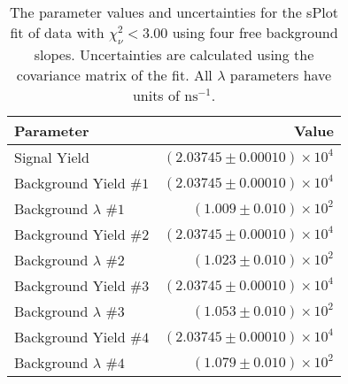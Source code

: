 
\begin{table}[ht]
    \begin{center}
        \begin{tabular}{lr}\toprule
            Parameter & Value \\\midrule
            Signal Yield & $(2.03745 \pm 0.00010) \times 10^{4}$ \\
            Background Yield $\#1$ & $(2.03745 \pm 0.00010) \times 10^{4}$ \\
            Background $\lambda$ $\#1$ & $(1.009 \pm 0.010) \times 10^{2}$ \\
            Background Yield $\#2$ & $(2.03745 \pm 0.00010) \times 10^{4}$ \\
            Background $\lambda$ $\#2$ & $(1.023 \pm 0.010) \times 10^{2}$ \\
            Background Yield $\#3$ & $(2.03745 \pm 0.00010) \times 10^{4}$ \\
            Background $\lambda$ $\#3$ & $(1.053 \pm 0.010) \times 10^{2}$ \\
            Background Yield $\#4$ & $(2.03745 \pm 0.00010) \times 10^{4}$ \\
            Background $\lambda$ $\#4$ & $(1.079 \pm 0.010) \times 10^{2}$ \\\bottomrule
        \end{tabular}
        \caption{The parameter values and uncertainties for the sPlot fit of data with $\chi^2_\nu < 3.00$ using four free background slopes. Uncertainties are calculated using the covariance matrix of the fit. All $\lambda$ parameters have units of $\si{\nano\second}^{-1}$.}\label{tab:splot-fit-results-chisqdof-3.00-free-4}
    \end{center}
\end{table}
